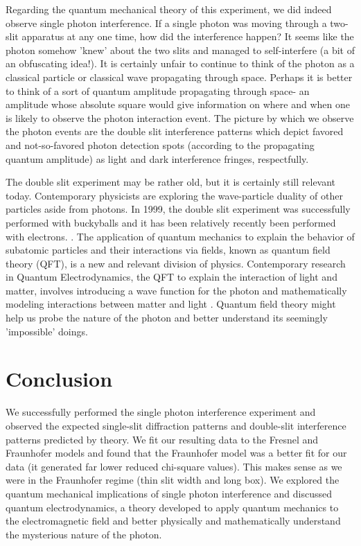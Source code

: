 \documentclass[prb,preprint]{revtex4-1}
\begin{document}
Regarding the quantum mechanical theory of this experiment, we did indeed observe single photon interference.  If a single photon was moving through a two-slit apparatus at any one time, how did the interference happen?  It seems like the photon somehow 'knew' about the two slits and managed to self-interfere (a bit of an obfuscating idea!).  It is certainly unfair to continue to think of the photon as a classical particle or classical wave propagating through space.  Perhaps it is better to think of a sort of quantum amplitude propagating through space- an amplitude whose absolute square would give information on where and when one is likely to observe the photon interaction event.  The picture by which we observe the photon events are the double slit interference patterns which depict favored and not-so-favored photon detection spots (according to the propagating quantum amplitude) as light and dark interference fringes, respectfully.  \cite{teachspin}

The double slit experiment may be rather old, but it is certainly still relevant today.  Contemporary physicists are exploring the wave-particle duality of other particles aside from photons.  In 1999, the double slit experiment was successfully performed with buckyballs and it has been relatively recently been performed with electrons.   \cite{bucky}.  The application of quantum mechanics to explain the behavior of subatomic particles and their interactions via fields, known as quantum field theory (QFT), is a new and relevant division of physics.  Contemporary research in Quantum Electrodynamics, the QFT to explain the interaction of light and matter, involves introducing a wave function for the photon and mathematically modeling interactions between matter and light \cite{iwo}.  Quantum field theory might help us probe the nature of the photon and better understand its seemingly 'impossible' doings.

\section{Conclusion}

We successfully performed the single photon interference experiment and observed the expected single-slit diffraction patterns and double-slit interference patterns predicted by theory.  We fit our resulting data to the Fresnel and Fraunhofer models and found that the Fraunhofer model was a better fit for our data (it generated far lower reduced chi-square values).  This makes sense as we were in the Fraunhofer regime (thin slit width and long box).  We explored the quantum mechanical implications of single photon interference and discussed quantum electrodynamics, a theory developed to apply quantum mechanics to the electromagnetic field and better physically and mathematically understand the mysterious nature of the photon.
\end{document}
